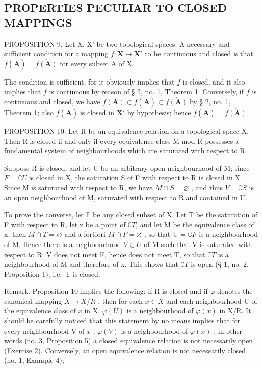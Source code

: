 \subsection{PROPERTIES PECULIAR TO CLOSED MAPPINGS}

PROPOSITION 9. Let X, X' be two topological spaces. A necessary and sufficient condition for a mapping \(f: \mathbf{X} \to \mathbf{X}'\) to be continuous and closed is that \(f(\overline{\mathbf{A}}) = \overline{f(\mathbf{A})}\) for every subset A of X.

The condition is sufficient, for it obviously implies that \(f\) is closed, and it also implies that \(f\) is continuous by reason of § 2, no. 1, Theorem 1. Conversely, if \(f\) is continuous and closed, we have \(f(\mathbf{A}) \subset f(\overline{\mathbf{A}}) \subset \overline{f(\mathbf{A})}\) by § 2, no. 1, Theorem 1; also \(f(\overline{\mathbf{A}})\) is closed in \(\mathbf{X}'\) by hypothesis; hence \(f(\overline{\mathbf{A}}) = \overline{f(\mathbf{A})}\) .

PROPOSITION 10. Let R be an equivalence relation on a topological space X. Then R is closed if and only if every equivalence class M mod R possesses a fundamental system of neighbourhoods which are saturated with respect to R.

Suppose R is closed, and let U be an arbitrary open neighbourhood of M; since \(F = \complement U\) is closed in X, the saturation S of F with respect to R is closed in X. Since M is saturated with respect to R, we have \(M \cap S = \varnothing\) , and thus \(V = \complement S\) is an open neighbourhood of M, saturated with respect to R and contained in U.

To prove the converse, let F be any closed subset of X. Let T be the saturation of F with respect to R, let x be a point of \(\complement T\), and let M be the equivalence class of x; then \(M \cap T = \varnothing\) and a fortiori \(M \cap F = \varnothing\) , so that U = \(\complement F\) is a neighbourhood of M. Hence there is a neighbourhood \(V \subset U\) of M such that V is saturated with respect to R; V does not meet F, hence does not meet T, so that \(\complement T\) is a neighbourhood of M and therefore of x. This shows that \(\complement T\) is open (§ 1, no. 2, Proposition 1), i.e.~T is closed.

Remark. Proposition 10 implies the following: if R is closed and if \(\varphi\) denotes the canonical mapping \(X \to X/R\) , then for each \(x \in X\) and each neighbourhood U of the equivalence class of \(x\) in X, \(\varphi(U)\) is a neighbourhood of \(\varphi(x)\) in X/R. It should be carefully noticed that this statement by no means implies that for every neighbourhood V of \(x\) , \(\varphi(V)\) is a neighbourhood of \(\varphi(x)\) ; in other words (no. 3, Proposition 5) a closed equivalence relation is not necessarily open (Exercise 2). Conversely, an open equivalence relation is not necessarily closed (no. 1, Example 4);

